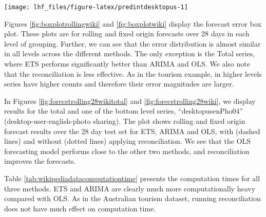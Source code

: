 \documentclass[11pt,a4paper,]{article}
\let\origfigure\figure
\let\endorigfigure\endfigure
\renewenvironment{figure}[1][2] {
    \expandafter\origfigure\expandafter[!htbp]
} {
    \endorigfigure
}
\begin{document}
\begin{figure}

{\centering \texttt{[image: lhf\_files/figure-latex/predintdesktopus-1]} 

}

\caption{The actual test set for the 'desktopusenPho04' bottom level series compared to the forecasts from reconciled and unreconciled OLS methods with prediction interval for rolling and fixed origin  Wikipedia pageviews.}\label{fig:predintdesktopus}
\end{figure}

Figures \ref{fig:boxplotrollingwiki} and \ref{fig:boxplotwiki} display the forecast error box plot. These plots are for rolling and fixed origin forecasts over 28 days in each level of grouping. Further, we can see that the error distribution is almost similar in all levels across the different methods. The only exception is the Total series, where ETS performs significantly better than ARIMA and OLS. We also note that the reconciliation is less effective. As in the tourism example, in higher levels series have higher counts and therefore their error magnitudes are larger.

In Figures \ref{fig:forecstrolling28wikitotal} and \ref{fig:forecstrolling28wiki}, we display results for the total and one of the bottom level series, ``desktopusenPho04'' (desktop-user-english-photo sharing). The plot shows rolling and fixed origin forecast results over the 28 day test set for ETS, ARIMA and OLS, with (dashed lines) and without (dotted lines) applying reconciliation. We see that the OLS forecasting model performs close to the other two methods, and reconciliation improves the forecasts.

Table \ref{tab:wikipediadatacomputationtime} presents the computation times for all three methods. ETS and ARIMA are clearly much more computationally heavy compared with OLS. As in the Australian tourism dataset, running reconciliation does not have much effect on computation time.
\end{document}
